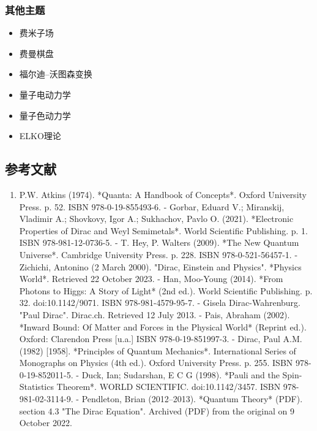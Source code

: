 \subsubsection{其他主题}
\begin{itemize}
\item 费米子场
\item 费曼棋盘
\item 福尔迪–沃图森变换
\item 量子电动力学
\item 量子色动力学
\item ELKO理论
\end{itemize}
\subsection{参考文献}

\begin{enumerate}
\item P.W. Atkins (1974). *Quanta: A Handbook of Concepts*. Oxford University Press. p. 52. ISBN 978-0-19-855493-6.
- Gorbar, Eduard V.; Miranskij, Vladimir A.; Shovkovy, Igor A.; Sukhachov, Pavlo O. (2021). *Electronic Properties of Dirac and Weyl Semimetals*. World Scientific Publishing. p. 1. ISBN 978-981-12-0736-5.
- T. Hey, P. Walters (2009). *The New Quantum Universe*. Cambridge University Press. p. 228. ISBN 978-0-521-56457-1.
- Zichichi, Antonino (2 March 2000). "Dirac, Einstein and Physics". *Physics World*. Retrieved 22 October 2023.
- Han, Moo-Young (2014). *From Photons to Higgs: A Story of Light* (2nd ed.). World Scientific Publishing. p. 32. doi:10.1142/9071. ISBN 978-981-4579-95-7.
- Gisela Dirac-Wahrenburg. "Paul Dirac". Dirac.ch. Retrieved 12 July 2013.
- Pais, Abraham (2002). *Inward Bound: Of Matter and Forces in the Physical World* (Reprint ed.). Oxford: Clarendon Press [u.a.] ISBN 978-0-19-851997-3.
- Dirac, Paul A.M. (1982) [1958]. *Principles of Quantum Mechanics*. International Series of Monographs on Physics (4th ed.). Oxford University Press. p. 255. ISBN 978-0-19-852011-5.
- Duck, Ian; Sudarshan, E C G (1998). *Pauli and the Spin-Statistics Theorem*. WORLD SCIENTIFIC. doi:10.1142/3457. ISBN 978-981-02-3114-9.
- Pendleton, Brian (2012–2013). *Quantum Theory* (PDF). section 4.3 "The Dirac Equation". Archived (PDF) from the original on 9 October 2022.
\end{enumerate}








